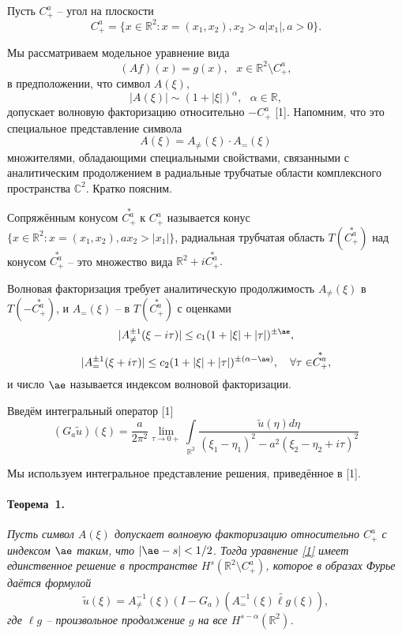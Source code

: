 
\vzmscaption



Пусть $C^a_+$ -- угол на плоскости
\[
C^a_+=\{x\in\mathbb R^2: x=(x_1,x_2), x_2>a|x_1|, a>0\}.
\]

Мы рассматриваем модельное уравнение вида
\begin{equation}\label{1}
(Af)(x)=g(x),~~~x\in\mathbb R^{2}\setminus C^a_+,
\end{equation}
в предположении, что символ $A(\xi)$,
 \[
 |A(\xi)|\sim(1+|\xi|)^{\alpha},~~~\alpha\in\mathbb R,
 \]
 допускает волновую факторизацию относительно $-C^a_+$ [1].  Напомним, что это специальное представление символа
\[
A(\xi)=A_{\neq}(\xi)\cdot A_=(\xi)
\]
 множителями, обладающими специальными свойствами, связанными с аналитическим продолжением в радиальные трубчатые области комплексного пространства  $\mathbb C^2$. Кратко поясним.

 Сопряжённым конусом $\stackrel{*}{C^a_+}$ к $C^a_+$  называется конус $\{x\in\mathbb R^2: x=(x_1,x_2), ax_2>|x_1|\}$, радиальная трубчатая область $T(\stackrel{*}{C^a_+})$ над конусом $\stackrel{*}{C^a_+}$ -- это множество вида $\mathbb R^2+i\stackrel{*}{C^a_+}.$

 Волновая факторизация требует аналитическую продолжимость $A_{\neq}(\xi)$ в $T(-\stackrel{*}{C^a_+})$, и $A_=(\xi)$ -- в $T(\stackrel{*}{C^a_+})$ с оценками
 \[
 |A^{\pm 1}_{\neq}(\xi-i\tau)|\leq c_1(1+|\xi|+|\tau|)^{\pm\ae},
 \]
 \[
 |A^{\pm 1}_=(\xi+i\tau)|\leq c_2(1+|\xi|+|\tau|)^{\pm(\alpha-\ae)},~~~\forall\tau\in\stackrel{*}{C^a_+},
 \]
и число $\ae$ называется индексом волновой факторизации.

Введём интегральный оператор [1]
\[
(G_a\tilde u)(\xi)=\frac{a}{2\pi^2}\lim\limits_{\tau\to 0+}\int\limits_{\mathbb R^2}\frac{\tilde u(\eta)d\eta}{(\xi_1-\eta_1)^2-a^2(\xi_2-\eta_2+i\tau)^2}
\]

Мы используем интегральное представление решения, приведённое в [1].

\paragraph{Теорема~1.} {\it
 Пусть символ $A(\xi)$ допускает волновую факторизацию относительно $C^a_+$ с индексом $\ae$ таким, что $|\ae-s|<1/2$. Тогда уравнение \eqref{1} имеет единственное решение в пространстве  $H^s(\mathbb R^2\setminus C^a_+)$, которое в образах Фурье даётся формулой
 \[
 \tilde u(\xi)=A^{-1}_{\neq}(\xi)(I-G_a)(A^{-1}_=(\xi)\widetilde{\ell g}(\xi)),
 \]
где $\ell g$ -- произвольное продолжение $g$ на все $H^{s-\alpha}(\mathbb R^2)$.
}

